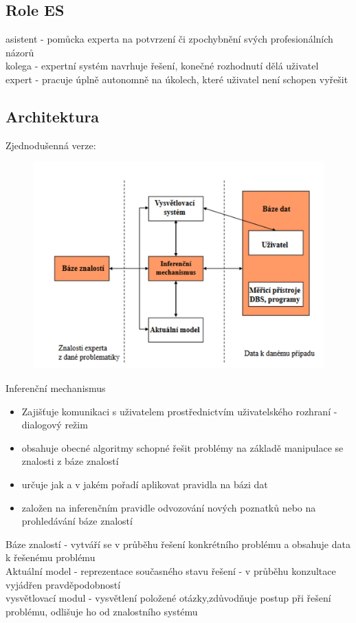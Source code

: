 \subsection{Role ES}
asistent - pomůcka experta na potvrzení či zpochybnění svých profesionálních názorů\\
kolega - expertní systém navrhuje řešení, konečné rozhodnutí dělá uživatel\\
expert - pracuje úplně autonomně na úkolech, které uživatel není schopen vyřešit\\

\subsection{Architektura}
Zjednodušenná verze:
\begin{figure}[H]
    \includegraphics[scale = 0.3]{images/ES_ez.png}
\end{figure}
Inferenční mechanismus
\begin{itemize}
    \item Zajišťuje komunikaci s uživatelem prostřednictvím uživatelského rozhraní - dialogový režim
    \item obsahuje obecné algoritmy schopné řešit problémy na základě manipulace se znalosti z báze znalostí
    \item určuje jak a v jakém pořadí aplikovat pravidla na bázi dat
    \item založen na inferenčním pravidle odvozování nových poznatků nebo na prohledávání báze znalostí
\end{itemize}
Báze znalostí - vytváří se v průběhu řešení konkrétního problému a obsahuje data k řešenému problému\\
Aktuální model - reprezentace současného stavu řešení - v průběhu konzultace vyjádřen pravděpodobností\\
vysvětlovací modul - vysvětlení položené otázky,zdůvodňuje postup při řešení problému, odlišuje ho od znalostního systému

